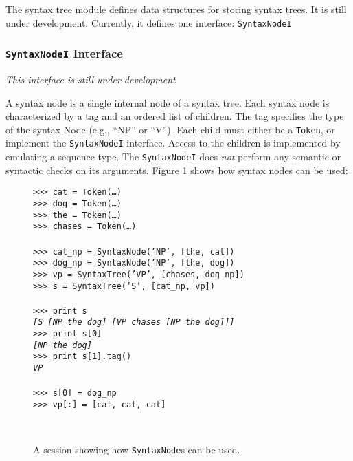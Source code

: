\documentclass{article}
\begin{document}
The syntax tree module defines data structures for storing syntax
trees.  It is still under development.  Currently, it defines one
interface: \texttt{SyntaxNodeI}

\subsubsection{\texttt{SyntaxNodeI} Interface}

\emph{This interface is still under development}

A syntax node is a single internal node of a syntax tree.  Each syntax
node is characterized by a tag and an ordered list of children.  The
tag specifies the type of the syntax Node (e.g., ``NP'' or ``V'').
Each child must either be a \texttt{Token}, or implement the
\texttt{SyntaxNodeI} interface.  Access to the children is implemented
by emulating a sequence type.  The \texttt{SyntaxNodeI} does
\emph{not} perform any semantic or syntactic checks on its arguments.
Figure \ref{fig:syntaxnode} shows how syntax nodes can be used:

\begin{figure}
\noindent
\begin{centering}
\begin{boxedminipage}{\textwidth}
\begin{tabbing}
\texttt{>>> cat = Token(\ldots)}\\
\texttt{>>> dog = Token(\ldots)}\\
\texttt{>>> the = Token(\ldots)}\\
\texttt{>>> chases = Token(\ldots)}\\
\\
\texttt{>>> cat\_np = SyntaxNode('NP', [the, cat])}\\
\texttt{>>> dog\_np = SyntaxNode('NP', [the, dog])}\\
\texttt{>>> vp = SyntaxTree('VP', [chases, dog\_np])}\\
\texttt{>>> s = SyntaxTree('S', [cat\_np, vp])}\\
\\
\texttt{>>> print s}\\
\texttt{\textit{[S [NP the dog] [VP chases [NP the dog]]]}}\\
\texttt{>>> print s[0]}\\
\texttt{\textit{[NP the dog]}}\\
\texttt{>>> print s[1].tag()}\\
\texttt{\textit{VP}}\\
\\
\texttt{>>> s[0] = dog\_np}\\
\texttt{>>> vp[:] = [cat, cat, cat]}\\
\end{tabbing}
\end{boxedminipage}\\
\end{centering}
 \caption[Example \texttt{SyntaxNode} use]
 {A session showing how \texttt{SyntaxNode}s can be used.}
\label{fig:syntaxnode}
\end{figure}
\end{document}
